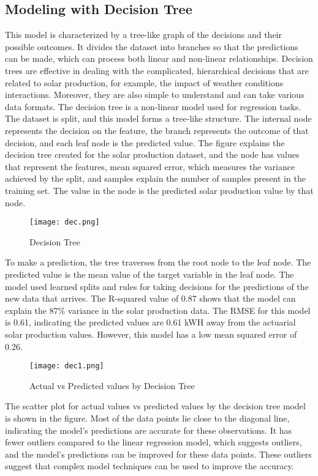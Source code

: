 \documentclass[conference]{IEEEtran}
\begin{document}
\subsection{Modeling with Decision Tree}
This model is characterized by a tree-like graph of the decisions and their possible outcomes. It divides the dataset into branches so that the predictions can be made, which can process both linear and non-linear relationships. Decision trees are effective in dealing with the complicated, hierarchical decisions that are related to solar production, for example, the impact of weather conditions interactions. Moreover, they are also simple to understand and can take various data formats. The decision tree is a non-linear model used for regression tasks. The dataset is split, and this model forms a tree-like structure. The internal node represents the decision on the feature, the branch represents the outcome of that decision, and each leaf node is the predicted value. The figure explains the decision tree created for the solar production dataset, and the node has values that represent the features, mean squared error, which measures the variance achieved by the split, and samples explain the number of samples present in the training set. The value in the node is the predicted solar production value by that node. 
\begin{figure}[H] %
    \centering
    \texttt{[image: dec.png]}
    \caption{Decision Tree}
    \label{fig: Decision Tree}
\end{figure}
To make a prediction, the tree traverses from the root node to the leaf node. The predicted value is the mean value of the target variable in the leaf node.  The model used learned splits and rules for taking decisions for the predictions of the new data that arrives. The R-squared value of 0.87 shows that the model can explain the 87\% variance in the solar production data.  The RMSE for this model is 0.61, indicating the predicted values are 0.61 kWH away from the actuarial solar production values. However, this model has a low mean squared error of 0.26.
\begin{figure}[H] %
    \centering
    \texttt{[image: dec1.png]}
    \caption{Actual vs Predicted values by Decision Tree}
    \label{fig: Actual vs Predicted values by Decision Tree}
\end{figure}
The scatter plot for actual values vs predicted values by the decision tree model is shown in the figure. Most of the data points lie close to the diagonal line, indicating the model’s predictions are accurate for these observations. It has fewer outliers compared to the linear regression model, which suggests outliers, and the model’s predictions can be improved for these data points. These outliers suggest that complex model techniques can be used to improve the accuracy.
\end{document}
